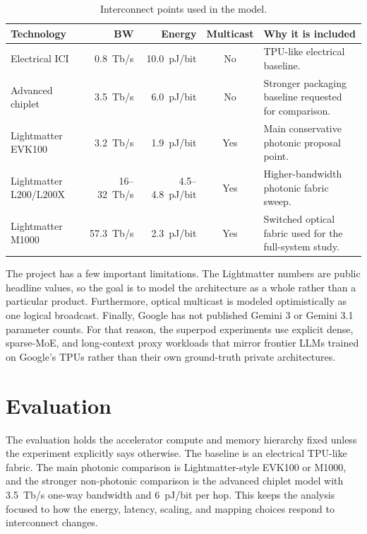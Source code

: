 \documentclass[conference,onecolumn]{IEEEtran}
\newcommand{\pjbit}{pJ/bit}
\newcommand{\tbps}{Tb/s}
\begin{document}
\begin{table}[H]
\centering
\caption{Interconnect points used in the model.}
\label{tab:tech}
\footnotesize
\begin{tabularx}{\linewidth}{l r r c Y}
\toprule
Technology & BW & Energy & Multicast & Why it is included \\
\midrule
Electrical ICI & 0.8~\tbps{} & 10.0~\pjbit{} & No & TPU-like electrical baseline. \\
Advanced chiplet & 3.5~\tbps{} & 6.0~\pjbit{} & No & Stronger packaging baseline requested for comparison. \\
Lightmatter EVK100 & 3.2~\tbps{} & 1.9~\pjbit{} & Yes & Main conservative photonic proposal point. \\
Lightmatter L200/L200X & 16--32~\tbps{} & 4.5--4.8~\pjbit{} & Yes & Higher-bandwidth photonic fabric sweep. \\
Lightmatter M1000 & 57.3~\tbps{} & 2.3~\pjbit{} & Yes & Switched optical fabric used for the full-system study. \\
\bottomrule
\end{tabularx}
\end{table}

The project has a few important limitations. The Lightmatter numbers are public
headline values, so the goal is to model the architecture as a whole rather than a particular product. Furthermore, optical multicast is modeled
optimistically as one logical broadcast. Finally, Google has not published
Gemini 3 or Gemini 3.1 parameter counts. For that reason, the superpod
experiments use explicit dense, sparse-MoE, and long-context proxy workloads
that mirror frontier LLMs trained on Google's TPUs rather than their own ground-truth private architectures.

\section{Evaluation}

The evaluation holds the accelerator compute and memory hierarchy fixed unless
the experiment explicitly says otherwise. The baseline is an electrical
TPU-like fabric. The main photonic comparison is Lightmatter-style EVK100 or
M1000, and the stronger non-photonic comparison is the advanced chiplet model
with 3.5~\tbps{} one-way bandwidth and 6~\pjbit{} per hop. This keeps the
analysis focused to how the energy, latency,
scaling, and mapping choices respond to interconnect changes.
\end{document}
